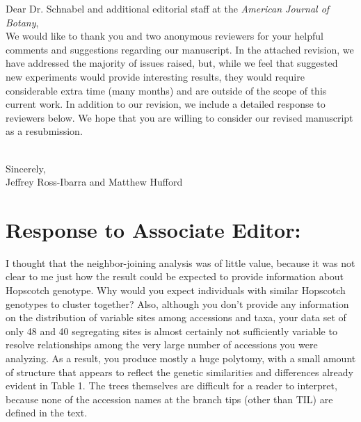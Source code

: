 \documentclass[11pt]{article}
\begin{document}
\noindent Dear Dr. Schnabel and additional editorial staff at the \emph{American Journal of Botany}, \\

We would like to thank you and two anonymous reviewers for your helpful comments and suggestions regarding our manuscript.  In the attached revision, we have addressed the majority of issues raised, but, while we feel that suggested new experiments would provide interesting results, they would require considerable extra time (many months) and are outside of the scope of this current work.  In addition to our revision, we include a detailed response to reviewers below. We hope that you are willing to consider our revised manuscript as a resubmission.\\\

\noindent Sincerely,\\

\noindent Jeffrey Ross-Ibarra and Matthew Hufford

\section*{Response to Associate Editor:}

I thought that the neighbor-joining analysis was of little value, because it was not clear to me just how the result could be expected to provide information about Hopscotch genotype.  Why would you expect individuals with similar Hopscotch genotypes to cluster together?  Also, although you don't provide any information on the distribution of variable sites among accessions and taxa, your data set of only 48 and 40 segregating sites is almost certainly not sufficiently variable to resolve relationships among the very large number of accessions you were analyzing.  As a result, you produce mostly a huge polytomy, with a small amount of structure that appears to reflect the genetic similarities and differences already evident in Table 1.  The trees themselves are difficult for a reader to interpret, because none of the accession names at the branch tips (other than TIL) are defined in the text.\\
\end{document}
